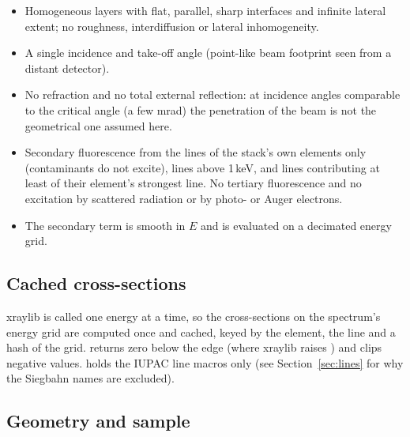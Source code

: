 \begin{hyp}
\begin{itemize}[nosep,leftmargin=1em]
\item Homogeneous layers with flat, parallel, sharp interfaces and infinite lateral extent;
  no roughness, interdiffusion or lateral inhomogeneity.
\item A single incidence and take-off angle (point-like beam footprint seen from a distant
  detector).
\item No refraction and no total external reflection: at incidence angles comparable to the
  critical angle (a few mrad) the penetration of the beam is not the geometrical one
  assumed here.
\item Secondary fluorescence from the lines of the stack's own elements only (contaminants
  do not excite), lines above 1\,keV, and lines contributing at least 
  of their element's strongest line. No tertiary fluorescence and no excitation by
  scattered radiation or by photo- or Auger electrons.
\item The secondary term is smooth in $E$ and is evaluated on a decimated energy grid.
\end{itemize}
\end{hyp}


\subsection{Cached cross-sections}

xraylib is called one energy at a time, so the cross-sections on the spectrum's energy grid
are computed once and cached, keyed by the element, the line and a hash of the grid.
 returns zero below the edge (where xraylib raises ) and clips
negative values.  holds the IUPAC line macros only (see
Section~\ref{sec:lines} for why the Siegbahn names are excluded).

\subsection{Geometry and sample}

